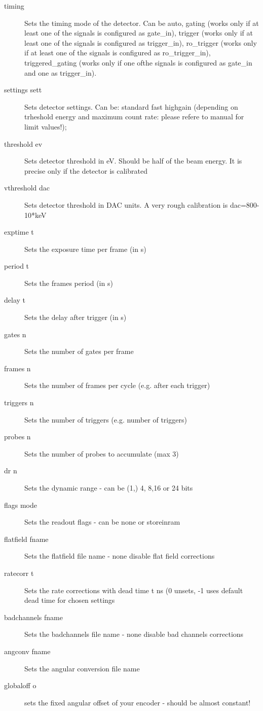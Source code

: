 \documentclass{report}
\begin{document}
\begin{description}
\item[timing]           Sets the timing mode of the detector. Can be auto, gating  (works only if at least one of the signals is configured as gate\_in), trigger (works only if at least one of the signals is configured as trigger\_in), ro\_trigger (works only if at least one of the signals is configured as ro\_trigger\_in), triggered\_gating (works only if one ofthe signals is configured as gate\_in and one as trigger\_in).
\item[settings sett]  	Sets detector settings. Can be:  standard fast  highgain (depending on trheshold energy and maximum count rate: please refere to manual for limit values!);
\item[threshold ev]  	Sets detector threshold in eV. Should be half of the beam energy. It is precise only if the detector is calibrated
\item[vthreshold dac]  	Sets detector threshold in DAC units. A very rough calibration is dac=800-10*keV
\item[exptime t]  	Sets the exposure time per frame (in s)
\item[period t] 	Sets the frames period (in s)
\item[delay t] 	Sets the delay after trigger (in s)
\item[gates n]  	Sets the number of gates per frame
\item[frames n]  	Sets the number of frames per cycle (e.g. after each trigger)
\item[triggers n]  	Sets the number of triggers (e.g. number of triggers)
\item[probes n]  	Sets the number of probes to accumulate (max 3)
\item[dr n]  		Sets the dynamic range - can be (1,) 4, 8,16 or 24 bits
\item[flags mode]  	Sets the readout flags - can be none or storeinram
\item[flatfield fname] Sets the flatfield file name - none disable flat field corrections
\item[ratecorr t]  	Sets the rate corrections with dead time t ns (0 unsets, -1 uses default dead time for chosen settings
\item[badchannels fname]  Sets the badchannels file name - none disable bad channels corrections
\item[angconv fname]  	Sets the angular conversion file name
\item[globaloff o]  	sets the fixed angular offset of your encoder - should be almost constant!

\end{description}
\end{document}
